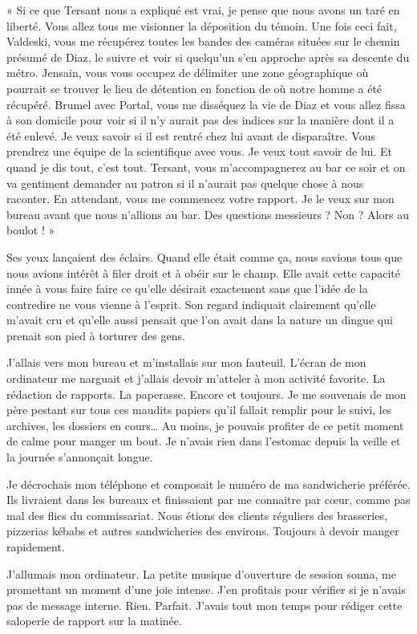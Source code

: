 « Si ce que Tersant nous a expliqué est vrai, je pense que nous avons un taré en liberté. Vous allez tous me visionner 
la déposition du témoin. Une fois ceci fait, Valdeski, vous me récupérez toutes les bandes des caméras situées sur le 
chemin présumé de Diaz, le suivre et voir si quelqu'un s'en approche après sa descente du métro. Jensain, vous vous 
occupez de délimiter une zone géographique où pourrait se trouver le lieu de détention en fonction de où notre homme a 
été récupéré. Brumel avec Portal, vous me disséquez la vie de Diaz et vous allez fissa à son domicile pour voir si il
n'y aurait pas des indices sur la manière dont il a été enlevé. Je veux savoir si il est rentré chez lui avant de
disparaître. Vous prendrez une équipe de la scientifique avec vous. Je veux tout savoir de lui. Et quand je dis tout, 
c'est tout. Tersant, vous m'accompagnerez au bar ce soir et on va gentiment demander au patron si il n'aurait pas 
quelque chose à nous raconter. En attendant, vous me commencez votre rapport. Je le veux sur mon bureau avant que nous 
n'allions au bar. Des questions messieurs ? Non ? Alors au boulot ! »

Ses yeux lançaient des éclairs. Quand elle était comme ça, nous savions tous que nous avions intérêt à filer droit et à
obéir sur le champ. Elle avait cette capacité innée à vous faire faire ce qu'elle désirait exactement sans que l'idée 
de la contredire ne vous vienne à l'esprit. Son regard indiquait clairement qu'elle m'avait cru et qu'elle aussi 
pensait que l'on avait dans la nature un dingue qui prenait son pied à torturer des gens.

J'allais vers mon bureau et m'installais sur mon fauteuil. L'écran de mon ordinateur me narguait et j'allais devoir 
m'atteler à mon activité favorite. La rédaction de rapports. La paperasse. Encore et toujours. Je me souvenais de 
mon père pestant sur tous ces maudits papiers qu'il fallait remplir pour le suivi, les archives, les dossiers en 
cours… Au moins, je pouvais profiter de ce petit moment de calme pour manger un bout. Je n'avais rien dans l'estomac 
depuis la veille et la journée s'annonçait longue.

Je décrochais mon téléphone et composait le numéro de ma sandwicherie préférée. Ils livraient dans les bureaux et 
finissaient par me connaitre par cœur, comme pas mal des flics du commissariat. Nous étions des clients réguliers des 
brasseries, pizzerias kébabs et autres sandwicheries des environs. Toujours à devoir manger rapidement.

J'allumais mon ordinateur. La petite musique d'ouverture de session sonna, me promettant un moment d'une joie intense. 
J'en profitais pour vérifier si je n'avais pas de message interne. Rien. Parfait. J'avais tout mon temps pour rédiger 
cette saloperie de rapport sur la matinée.

